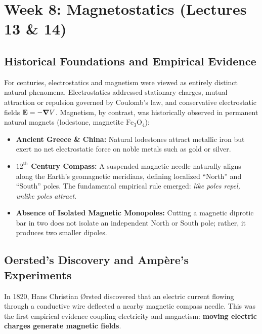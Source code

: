 
\section{Week 8: Magnetostatics (Lectures 13 \& 14)}
\label{sec:week8_master}

\subsection{Historical Foundations and Empirical Evidence}
\label{sec:intro_history}

For centuries, electrostatics and magnetism were viewed as entirely distinct natural phenomena. Electrostatics addressed stationary charges, mutual attraction or repulsion governed by Coulomb's law, and conservative electrostatic fields $\vb{E} = -\grad V$. Magnetism, by contrast, was historically observed in permanent natural magnets (lodestone, magnetite $\mathrm{Fe}_3\mathrm{O}_4$):
\begin{itemize}
    \item \textbf{Ancient Greece \& China:} Natural lodestones attract metallic iron but exert no net electrostatic force on noble metals such as gold or silver.
    \item \textbf{$12^{\mathrm{th}}$ Century Compass:} A suspended magnetic needle naturally aligns along the Earth's geomagnetic meridians, defining localized ``North'' and ``South'' poles. The fundamental empirical rule emerged: \emph{like poles repel, unlike poles attract}.
    \item \textbf{Absence of Isolated Magnetic Monopoles:} Cutting a magnetic diprotic bar in two does not isolate an independent North or South pole; rather, it produces two smaller dipoles.
\end{itemize}

\subsection{Oersted's Discovery and Ampère's Experiments}

In 1820, Hans Christian {\O}rsted discovered that an electric current flowing through a conductive wire deflected a nearby magnetic compass needle. This was the first empirical evidence coupling electricity and magnetism: \textbf{moving electric charges generate magnetic fields}.

